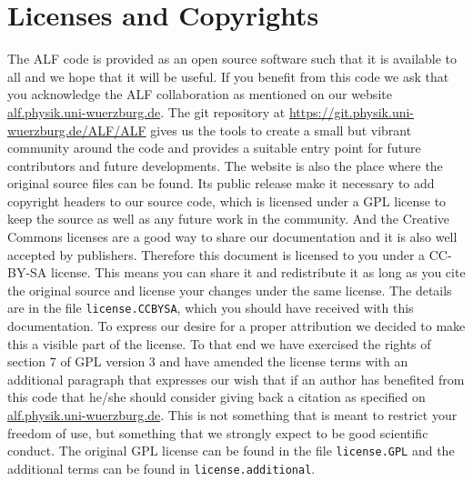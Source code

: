 

\section{Licenses and Copyrights}

The  ALF code  is provided as an open source software  such that it is  available  to all and we  hope that  it 
will be useful.  If you benefit from this code  we ask that you acknowledge  the ALF collaboration  as mentioned on our website \url{alf.physik.uni-wuerzburg.de}.  The git repository at \url{https://git.physik.uni-wuerzburg.de/ALF/ALF} gives us the tools to create a small but vibrant community around the code and provides a suitable entry point for future contributors  and future developments. 
The website is also the place where the original source files can be found.
Its public release make it necessary to add copyright headers to our source code, which is licensed under a GPL license to keep the source as well as any future work in the community. And the Creative Commons licenses are a good way to share our documentation and it is also well accepted by publishers. Therefore this document is licensed to you under a CC-BY-SA license.
This means you can share it and redistribute it as long as you cite the original source and license your changes under the same license. The details are in the file \texttt{license.CCBYSA}, which you should have received with this documentation.
To express our desire for a proper attribution we decided to make this a visible part of the license.
To that end we have exercised the rights of section 7 of GPL version 3 and have amended the license terms with an additional paragraph that expresses our wish that if an author has benefited from this code
that he/she should consider giving back a citation as specified on \url{alf.physik.uni-wuerzburg.de}.
This is not something that is meant to restrict your freedom of use, but something that we strongly expect to be good scientific conduct.
The original GPL license can be found in the file \texttt{license.GPL} and the additional terms can be found in \texttt{license.additional}.
